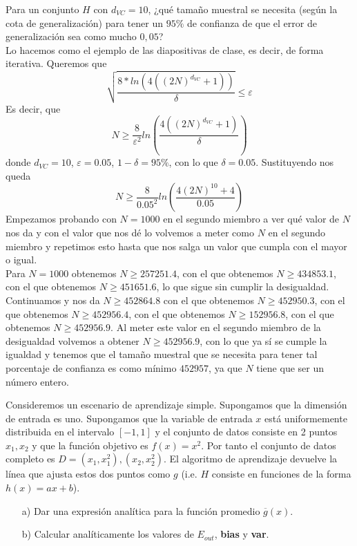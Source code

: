 \documentclass[12pt]{article}
\theoremstyle{definition}
\begin{document}
\begin{pregunta}
Para un conjunto $H$ con $d_{VC}=10$, ¿qué tamaño muestral se necesita (según la cota de generalización) para tener un $95\%$ de confianza de que el error de generalización sea como mucho $0,05$?\\

Lo hacemos como el ejemplo de las diapositivas de clase, es decir, de forma iterativa. Queremos que
\begin{equation}
\sqrt{\frac{8*ln(4((2N)^{d_{VC}} + 1))}{\delta}} \leq \varepsilon
\end{equation}
Es decir, que 
\begin{equation}
N \geq \frac{8}{\varepsilon^2}ln(\frac{4((2N)^{d_{VC}}+1)}{\delta})
\end{equation}
donde $d_{VC}=10$, $\varepsilon=0.05$, $1-\delta=95\%$, con lo que $\delta=0.05$. Sustituyendo nos queda 
\begin{equation}
N \geq \frac{8}{0.05^2}ln(\frac{4(2N)^{10}+4}{0.05})
\end{equation}
Empezamos probando con $N=1000$ en el segundo miembro a ver qué valor de $N$ nos da y con el valor que nos dé lo volvemos a meter como $N$ en el segundo miembro y repetimos esto hasta que nos salga un valor que cumpla con el mayor o igual.\\
Para $N=1000$ obtenemos $N\geq257251.4$, con el que obtenemos $N\geq434853.1$, con el que obtenemos $N\geq451651.6$, lo que sigue sin cumplir la desigualdad. Continuamos y nos da $N\geq452864.8$ con el que obtenemos $N\geq452950.3$, con el que obtenemos $N\geq452956.4$, con el que obtenemos $N\geq152956.8$, con el que obtenemos $N\geq452956.9$. Al meter este valor en el segundo miembro de la desigualdad volvemos a obtener $N\geq452956.9$, con lo que ya sí se cumple la igualdad y tenemos que el tamaño muestral que se necesita para tener tal porcentaje de confianza es como mínimo $452957$, ya que $N$ tiene que ser un número entero.
\end{pregunta}

\begin{pregunta}
Consideremos un escenario de aprendizaje simple. Supongamos que la dimensión de entrada es uno. Supongamos que la variable de entrada $x$ está uniformemente distribuida en el intervalo $[-1,1]$ y el conjunto de datos consiste en 2 puntos ${x_1,x_2}$ y que la función objetivo es $f(x)=x^2$. Por tanto el conjunto de datos completo es $D={(x_1,x_1^2), (x_2,x_2^2)}$. El algoritmo de aprendizaje devuelve la línea que ajusta estos dos puntos como $g$ (i.e. $H$ consiste en funciones de la forma $h(x)=ax+b$).
\begin{enumerate}
\item[a)] Dar una expresión analítica para la función promedio $\overline{g}(x)$.
\item[b)] Calcular analíticamente los valores de $E_{out}$, \textbf{bias} y \textbf{var}.
\end{enumerate}
\textit{ }\\


\end{pregunta}
\end{document}
